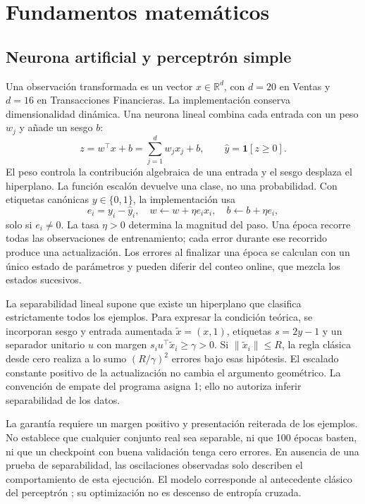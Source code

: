\section{Fundamentos matemáticos}
\subsection{Neurona artificial y perceptrón simple}
Una observación transformada es un vector $x\in\mathbb R^d$, con $d=20$ en Ventas y $d=16$ en Transacciones Financieras. La implementación conserva dimensionalidad dinámica. Una neurona lineal combina cada entrada con un peso $w_j$ y añade un sesgo $b$:
\begin{equation}z=w^\top x+b=\sum_{j=1}^{d}w_jx_j+b,\qquad \widehat y=\mathbf1[z\geq 0].\label{eq:perceptron}\end{equation}
El peso controla la contribución algebraica de una entrada y el sesgo desplaza el hiperplano. La función escalón devuelve una clase, no una probabilidad. Con etiquetas canónicas $y\in\{0,1\}$, la implementación usa
\begin{equation}e_i=y_i-\widehat y_i,\quad w\leftarrow w+\eta e_i x_i,\quad b\leftarrow b+\eta e_i,\label{eq:actualizacion}\end{equation}
solo si $e_i\neq0$. La tasa $\eta>0$ determina la magnitud del paso. Una época recorre todas las observaciones de entrenamiento; cada error durante ese recorrido produce una actualización. Los errores al finalizar una época se calculan con un único estado de parámetros y pueden diferir del conteo online, que mezcla los estados sucesivos.

La separabilidad lineal supone que existe un hiperplano que clasifica estrictamente todos los ejemplos. Para expresar la condición teórica, se incorporan sesgo y entrada aumentada $\widetilde x=(x,1)$, etiquetas $s=2y-1$ y un separador unitario $u$ con margen $s_i u^\top\widetilde x_i\geq\gamma>0$. Si $\|\widetilde x_i\|\leq R$, la regla clásica desde cero realiza a lo sumo $(R/\gamma)^2$ errores bajo esas hipótesis. El escalado constante positivo de la actualización no cambia el argumento geométrico. La convención de empate del programa asigna 1; ello no autoriza inferir separabilidad de los datos.

La garantía requiere un margen positivo y presentación reiterada de los ejemplos. No establece que cualquier conjunto real sea separable, ni que 100 épocas basten, ni que un checkpoint con buena validación tenga cero errores. En ausencia de una prueba de separabilidad, las oscilaciones observadas solo describen el comportamiento de esta ejecución. El modelo corresponde al antecedente clásico del perceptrón \cite{rosenblatt}; su optimización no es descenso de entropía cruzada.

